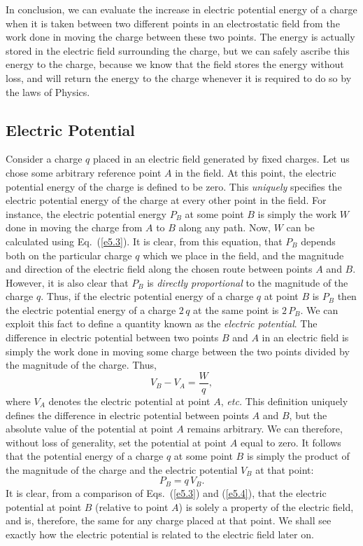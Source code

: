 In conclusion, we can evaluate the increase in electric potential energy of a charge when
it is taken between two different points in an electrostatic field from the
work done in moving the charge between these two points. The energy is actually
stored in the electric field surrounding the charge, but we can safely ascribe
this energy to the charge, because we know that the field stores the energy without loss,
and will return the energy to the charge whenever it is required to do so by the
laws of Physics. 

\subsection{Electric Potential}
Consider a charge $q$ placed in an electric field generated by fixed charges.
Let us chose some arbitrary reference point $A$ in the field.
At this point, the  electric
potential energy of the charge is defined to be zero. This 
{\em uniquely}\/ specifies the
electric potential energy of the charge at every other point in the field. 
For instance, the electric potential energy $P_B$ at some point $B$ is
simply the work $W$ done in moving the charge from $A$ to $B$ along any path. Now,
$W$ can be calculated using Eq.~(\ref{e5.3}). It is clear, from this equation, that
$P_B$ depends  both on the particular charge $q$ which we place in the
field, and the magnitude and direction of the electric field along the chosen route between points $A$ and $B$. However, it is also clear that
$P_B$ is {\em directly proportional}\/ to the magnitude of the
charge $q$. Thus, if the electric
potential energy of a charge $q$ at point $B$ is $P_B$ then the electric potential
energy of a charge $2\,q$ at the same point is $2 \,P_B$. We can exploit
this fact to define a quantity known as the {\em electric potential}. The
difference in electric potential between two points $B$ and $A$ in an electric
field is simply the work done in moving some charge between the two points
divided by the magnitude of the charge. Thus,
\begin{equation}\label{e5.5}
V_B - V_A = \frac{W}{q},
\end{equation}
where $V_A$ denotes the electric potential at point $A$, {\em etc.} This definition
uniquely defines the difference in electric potential between points $A$ and
$B$, but the absolute value of the potential at point $A$ remains arbitrary. 
We can therefore, without loss of generality, set the potential at point $A$ equal to
zero. It follows that the potential energy of a charge $q$ at some point $B$
is simply the product of the magnitude of the charge and the electric
potential $V_B$ at that point:
\begin{equation}
P_B = q\,V_B.
\end{equation}
It is clear, from a comparison of Eqs.~(\ref{e5.3}) and (\ref{e5.4}), that the electric
potential at point $B$ (relative to point $A$) is solely a property of the
electric field, and is, therefore, the same for any charge placed at that point. 
We shall see exactly  how the electric potential is related to the electric
field later on. 


